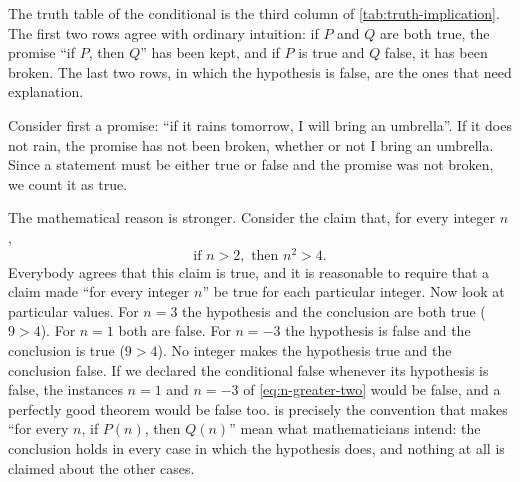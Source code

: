 The truth table of the conditional is the third column of \cref{tab:truth-implication}. The first two rows agree with ordinary intuition: if $P$ and $Q$ are both true, the promise ``if $P$, then $Q$'' has been kept, and if $P$ is true and $Q$ false, it has been broken. The last two rows, in which the hypothesis is false, are the ones that need explanation.

\begin{table}
\end{table}

Consider first a promise: ``if it rains tomorrow, I will bring an umbrella''. If it does not rain, the promise has not been broken, whether or not I bring an umbrella. Since a statement must be either true or false and the promise was not broken, we count it as true.

The mathematical reason is stronger. Consider the claim that, for every integer $n$,
\begin{equation}
\text{if } n>2, \text{ then } n^2>4.
\label{eq:n-greater-two}
\end{equation}
Everybody agrees that this claim is true, and it is reasonable to require that a claim made ``for every integer $n$'' be true for each particular integer. Now look at particular values. For $n=3$ the hypothesis and the conclusion are both true ($9>4$). For $n=1$ both are false. For $n=-3$ the hypothesis is false and the conclusion is true ($9>4$). No integer makes the hypothesis true and the conclusion false. If we declared the conditional false whenever its hypothesis is false, the instances $n=1$ and $n=-3$ of \eqref{eq:n-greater-two} would be false, and a perfectly good theorem would be false too.  is precisely the convention that makes ``for every $n$, if $P(n)$, then $Q(n)$'' mean what mathematicians intend: the conclusion holds in every case in which the hypothesis does, and nothing at all is claimed about the other cases.

